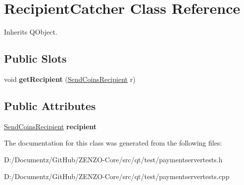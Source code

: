 \hypertarget{class_recipient_catcher}{}\section{Recipient\+Catcher Class Reference}
\label{class_recipient_catcher}


Inherits Q\+Object.

\subsection*{Public Slots}
\begin{DoxyCompactItemize}
\item 
\mbox{\label{class_recipient_catcher_a8358593057a05ad8d4b0530040f79301}} 
void {\bfseries get\+Recipient} (\mbox{\hyperlink{class_send_coins_recipient}{Send\+Coins\+Recipient}} r)
\end{DoxyCompactItemize}
\subsection*{Public Attributes}
\begin{DoxyCompactItemize}
\item 
\mbox{\label{class_recipient_catcher_a5645bda3783d7bf06781b0003faa4446}} 
\mbox{\hyperlink{class_send_coins_recipient}{Send\+Coins\+Recipient}} {\bfseries recipient}
\end{DoxyCompactItemize}


The documentation for this class was generated from the following files\+:\begin{DoxyCompactItemize}
\item 
D\+:/\+Documentz/\+Git\+Hub/\+Z\+E\+N\+Z\+O-\/\+Core/src/qt/test/paymentservertests.\+h\item 
D\+:/\+Documentz/\+Git\+Hub/\+Z\+E\+N\+Z\+O-\/\+Core/src/qt/test/paymentservertests.\+cpp\end{DoxyCompactItemize}
